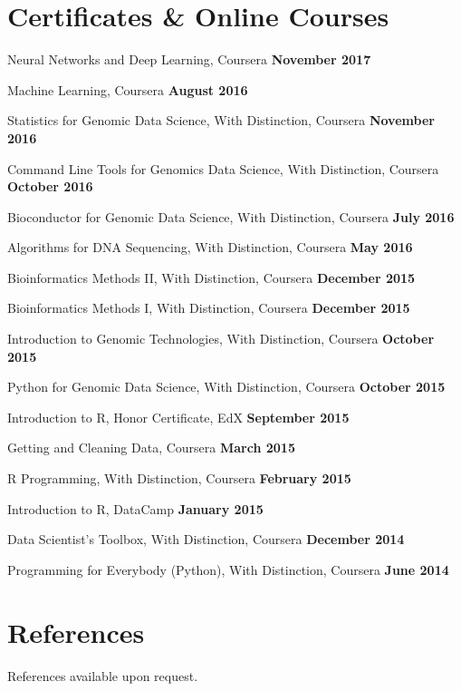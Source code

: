 \documentclass[margin,line]{res}
\begin{document}
\begin{resume}
\section{\sc Certificates \& Online Courses}
\begin{list2}
\item Neural Networks and Deep Learning, Coursera \hfill {\bf November 2017}
\item Machine Learning, Coursera \hfill {\bf August 2016}
\item Statistics for Genomic Data Science, With Distinction, Coursera \hfill {\bf November 2016}
\item Command Line Tools for Genomics Data Science, With Distinction, Coursera \hfill {\bf October 2016}
\item Bioconductor for Genomic Data Science, With Distinction, Coursera \hfill {\bf July 2016}
\item Algorithms for DNA Sequencing, With Distinction, Coursera \hfill {\bf May 2016}
\item Bioinformatics Methods II, With Distinction, Coursera \hfill {\bf December 2015}
\item Bioinformatics Methods I, With Distinction, Coursera \hfill {\bf December 2015}
\item Introduction to Genomic Technologies, With Distinction, Coursera \hfill {\bf October 2015}
\item Python for Genomic Data Science, With Distinction, Coursera \hfill {\bf October 2015}
\item Introduction to R, Honor Certificate, EdX \hfill {\bf September 2015}
\item Getting and Cleaning Data, Coursera \hfill {\bf March 2015}
\item R Programming, With Distinction, Coursera \hfill {\bf February 2015}
\item Introduction to R, DataCamp \hfill {\bf January 2015}
\item Data Scientist's Toolbox, With Distinction, Coursera \hfill {\bf December 2014}
\item Programming for Everybody (Python), With Distinction, Coursera \hfill {\bf June 2014}
\end{list2}


\section{\sc References}
References available upon request.


\end{resume}
\end{document}
